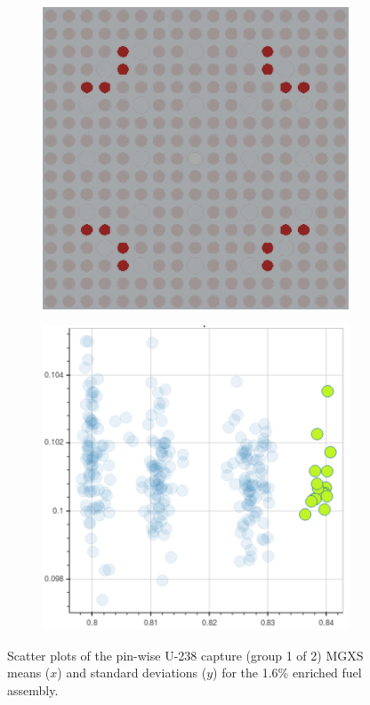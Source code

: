 \begin{figure}[h!]
\begin{subfigure}{0.45\textwidth}
  \caption{}
  \label{fig:chap10-capt-mean-std-mgxs-2}
\end{subfigure}
\begin{subfigure}{0.45\textwidth}
  \centering
  \includegraphics[width=0.9\linewidth]{figures/unsupervised/features/assm-16/u238-capt/mean-std/geometry-3}
  \caption{}
  \label{fig:chap10-capt-mean-std-geom-3}
\end{subfigure}%
\begin{subfigure}{0.45\textwidth}
  \centering
  \includegraphics[width=0.9\linewidth]{figures/unsupervised/features/assm-16/u238-capt/mean-std/mgxs-3}
  \caption{}
  \label{fig:chap10-capt-mean-std-mgxs-3}
\end{subfigure}
\caption[Clustering of U-238 capture MGXS standard deviations]{Scatter plots of the pin-wise U-238 capture (group 1 of 2) \ac{MGXS} means ($x$) and standard deviations ($y$) for the 1.6\% enriched fuel assembly.}
\label{fig:chap10-capt-mean-std}
\end{figure}

